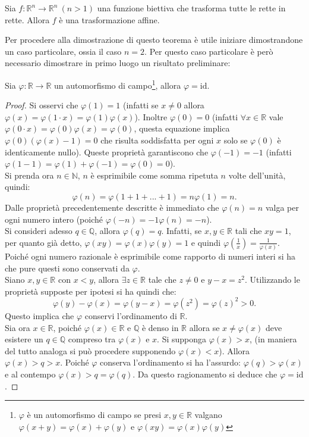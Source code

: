 \begin{thm}
Sia $f:\mathbb{R}^n\rightarrow\mathbb{R}^n\ (n>1)$ una funzione biettiva che trasforma tutte le rette in rette. Allora $f$ è una trasformazione affine. 
\label{thm:LinGenMain}
\end{thm}
Per procedere alla dimostrazione di questo teorema è utile iniziare dimostrandone un caso particolare, ossia il caso $n=2$. Per questo caso particolare è però necessario dimostrare in primo luogo un risultato preliminare:
\begin{prop}
	Sia $\varphi:\mathbb{R}\rightarrow\mathbb{R}$ un automorfismo di campo\footnote{$\varphi$ è un automorfismo di campo se presi $x,y\in \mathbb{R}$ valgano $\varphi(x+y)=\varphi(x)+\varphi(y)$ e $\varphi(xy)=\varphi(x)\varphi(y)$}, allora $\varphi=\text{id}$.
\end{prop}	
\begin{proof}
	Si osservi che $\varphi(1)=1$ (infatti se $x\neq0$ allora $\varphi(x)=\varphi(1\cdot x)=\varphi(1)\varphi(x)$). Inoltre $\varphi(0)=0$ (infatti $\forall x\in\mathbb{R}$ vale $\varphi(0\cdot x)=\varphi(0)\varphi(x)=\varphi(0)$, questa equazione implica $\varphi(0)(\varphi(x)-1)=0$ che risulta soddisfatta per ogni $x$ solo se $\varphi(0)$ è identicamente nullo). Queste proprietà garantiscono che $\varphi(-1)=-1$ (infatti $\varphi(1-1)=\varphi(1)+\varphi(-1)=\varphi(0)=0$).\\
	Si prenda ora $n\in\mathbb{N}$, $n$ è esprimibile come somma ripetuta $n$ volte dell'unità, quindi:
	\begin{equation*}
		\varphi(n)=\varphi(1+1+...+1)=n\varphi(1)=n.
	\end{equation*}
	Dalle proprietà precedentemente descritte è immediato che $\varphi(n)=n$ valga per ogni numero intero (poiché $\varphi(-n)=-1\varphi(n)=-n$).\\
	Si consideri adesso $q\in \mathbb{Q}$, allora $\varphi(q)=q$. Infatti, se $x,y\in\mathbb{R}$ tali che $xy=1$, per quanto già detto, $\varphi(xy)=\varphi(x)\varphi(y)=1$ e quindi $\varphi(\frac{1}{x})=\frac{1}{\varphi(x)}$. Poiché ogni numero razionale è esprimibile come rapporto di numeri interi si ha che pure questi sono conservati da $\varphi$.\\
	Siano $x,y\in \mathbb{R}$ con $x<y$, allora $\exists z\in\mathbb{R}$ tale che $z\neq0$ e $y-x=z^2$. Utilizzando le proprietà supposte per ipotesi si ha quindi che:
	\begin{equation*}
		\varphi(y)-\varphi(x)=\varphi(y-x)=\varphi(z^2)=\varphi(z)^2>0.
	\end{equation*}
	Questo implica che $\varphi$ conservi l'ordinamento di $\mathbb{R}$.\\
	Sia ora $x\in\mathbb{R}$, poiché $\varphi(x)\in\mathbb{R}$ e $\mathbb{Q}$ è denso in $\mathbb{R}$ allora se $x\neq\varphi(x)$ deve esistere un $q\in\mathbb{Q}$ compreso tra $\varphi(x)$ e $x$. Si supponga $\varphi(x)>x$, (in maniera del tutto analoga si può procedere supponendo $\varphi(x)<x$). Allora $\varphi(x)> q> x$. Poiché $\varphi$ conserva l'ordinamento si ha l'assurdo: $\varphi(q)>\varphi(x)$ e al contempo $\varphi(x)>q=\varphi(q)$. Da questo ragionamento si deduce che $\varphi=\text{id}$.
\end{proof}
